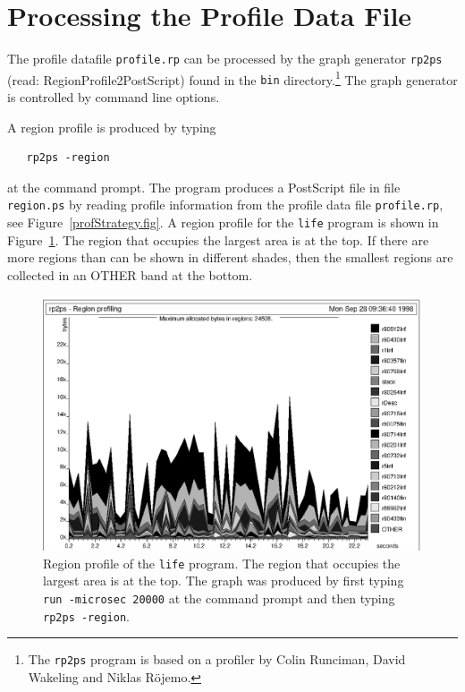 \documentclass[12pt]{book}
\begin{document}
\section{Processing the Profile Data File}
The profile datafile {\tt profile.rp} can be processed by the 
%
graph generator {\tt rp2ps} (read: RegionProfile2PostScript) found
in the {\tt bin} directory.\footnote{The {\tt rp2ps} program is based on a profiler by
  Colin Runciman, David Wakeling and Niklas R\"{o}jemo.} The graph
generator is controlled by command line options.

A 
%
%
region profile is produced by typing
\begin{verbatim}
   rp2ps -region
\end{verbatim}
at the command prompt. The program produces a PostScript file in
file {\tt region.ps} by reading profile information from the 
%
profile data file {\tt profile.rp}, see Figure~\ref{profStrategy.fig}.
A region profile for the {\tt life} program is shown in
Figure~\ref{prof_eks1.fig}. The region that occupies the largest area
is at the top. If there are more regions than can be shown in
different shades, then the smallest regions are collected in an OTHER
band at the bottom.

\begin{figure}
\begin{center}
\includegraphics{prof_eks1.ps}
\end{center}
\caption{Region profile of the {\tt life} program. The region 
  that occupies the largest area is at the top. The graph was 
  produced by first typing \texttt{run -microsec 20000} at the
  command prompt and then typing \texttt{rp2ps -region}.}
\label{prof_eks1.fig}
\end{figure}
\end{document}

